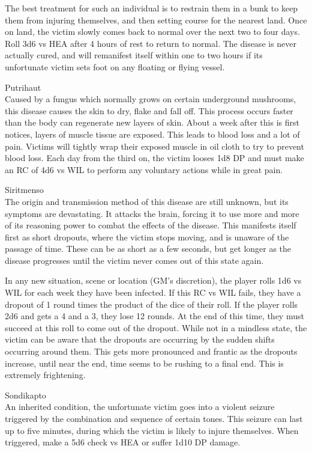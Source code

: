 The best treatment for such an individual is to restrain them in a bunk to keep them from injuring themselves, and then setting course for the nearest land. Once on land, the victim slowly comes back to normal over the next two to four days. Roll 3d6 vs HEA after 4 hours of rest to return to normal. The disease is never actually cured, and will remanifest itself within one to two hours if its unfortunate victim sets foot on any floating or flying vessel.

Putrihaut\\
Caused by a fungus which normally grows on certain underground mushrooms, this disease causes the skin to dry, flake and fall off. This process occurs faster than the body can regenerate new layers of skin. About a week after this is first notices, layers of muscle tissue are exposed. This leads to blood loss and a lot of pain. Victims will tightly wrap their exposed muscle in oil cloth to try to prevent blood loss. Each day from the third on, the victim looses 1d8 DP and must make an RC of 4d6 vs WIL to perform any voluntary actions while in great pain.

Siritmenso\\
The origin and transmission method of this disease are still unknown, but its symptoms are devastating. It attacks the brain, forcing it to use more and more of its reasoning power to combat the effects of the disease. This manifests itself first as short dropouts, where the victim stops moving, and is unaware of the passage of time. These can be as short as a few seconds, but get longer as the disease progresses until the victim never comes out of this state again.

In any new situation, scene or location (GM's discretion), the player rolls 1d6 vs WIL for each week they have been infected. If this RC vs WIL fails, they have a dropout of 1 round times the product of the dice of their roll. If the player rolls 2d6 and gets a 4 and a 3, they lose 12 rounds. At the end of this time, they must succeed at this roll to come out of the dropout. While not in a mindless state, the victim can be aware that the dropouts are occurring by the sudden shifts occurring around them. This gets more pronounced and frantic as the dropouts increase, until near the end, time seems to be rushing to a final end. This is extremely frightening.

Sondikapto\\
An inherited condition, the unfortunate victim goes into a violent seizure triggered by the combination and sequence of certain tones. This seizure can last up to five minutes, during which the victim is likely to injure themselves. When triggered, make a 5d6 check vs HEA or suffer 1d10 DP damage.

